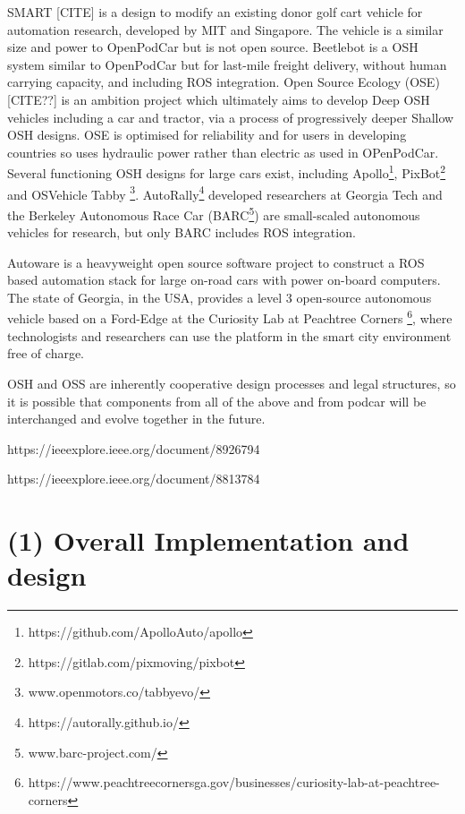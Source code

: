\documentclass[a4paper]{article}
\begin{document}
SMART [CITE] is a design to modify an existing donor golf cart vehicle for automation research, developed by MIT and Singapore.  The vehicle is a similar size and power to OpenPodCar but is not open source.
Beetlebot \cite{beetlebot} is a OSH system similar to OpenPodCar but for last-mile freight delivery, without human carrying capacity, and including ROS integration.
Open Source Ecology (OSE) [CITE??] is an ambition project which ultimately aims to develop Deep OSH vehicles including a car and tractor, via a process of progressively deeper Shallow OSH designs.  OSE is optimised for reliability and for users in developing countries so uses hydraulic power rather than electric as used in OPenPodCar.
Several functioning OSH designs for large cars exist, including Apollo\footnote{https://github.com/ApolloAuto/apollo}, PixBot\footnote{https://gitlab.com/pixmoving/pixbot} and OSVehicle Tabby \footnote{www.openmotors.co/tabbyevo/}.  AutoRally\footnote{https://autorally.github.io/} \cite{goldfain2019autorally} developed researchers at Georgia Tech and the Berkeley Autonomous Race Car (BARC\footnote{www.barc-project.com/}) are small-scaled autonomous vehicles for research, but only BARC includes ROS integration. 

Autoware \cite{kato2018autoware} is a heavyweight open source software project to construct a ROS based automation stack for large on-road cars with power on-board computers.
The state of Georgia, in the USA, provides a level 3 open-source autonomous vehicle based on a Ford-Edge at the Curiosity Lab at Peachtree Corners \footnote{https://www.peachtreecornersga.gov/businesses/curiosity-lab-at-peachtree-corners}, where technologists and researchers can use the platform in the smart city environment free of charge.


OSH and OSS are inherently cooperative design processes and legal structures, so it is possible that components from all of the above and from podcar will be interchanged and evolve together in the future.

https://ieeexplore.ieee.org/document/8926794


https://ieeexplore.ieee.org/document/8813784



\section{(1) Overall Implementation and design}\label{h.1u7vph94gfbt}

\end{document}
